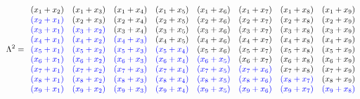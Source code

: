 \documentclass[11]{article}
\begin{document}
\[
\Lambda^2 =
\begin{array}{llllllll}
(x_1+x_2) & (x_1+x_3) & (x_1+x_4) & (x_1+x_5) & (x_1+x_6) & (x_1+x_7) & (x_1+x_8) & (x_1+x_9) \\
\textcolor{blue}{(x_2+x_1)} & (x_2+x_3) & (x_2+x_4) & (x_2+x_5) & (x_2+x_6) & (x_2+x_7) & (x_2+x_8) & (x_2+x_9) \\
\textcolor{blue}{(x_3+x_1)} & \textcolor{blue}{(x_3+x_2)} & (x_3+x_4) & (x_3+x_5) & (x_3+x_6) & (x_3+x_7) & (x_3+x_8) & (x_3+x_9) \\
\textcolor{blue}{(x_4+x_1)} & \textcolor{blue}{(x_4+x_2)} & \textcolor{blue}{(x_4+x_3)} & (x_4+x_5) & (x_4+x_6) & (x_4+x_7) & (x_4+x_8) & (x_4+x_9) \\
\textcolor{blue}{(x_5+x_1)} & \textcolor{blue}{(x_5+x_2)} & \textcolor{blue}{(x_5+x_3)} & \textcolor{blue}{(x_5+x_4)} & (x_5+x_6) & (x_5+x_7) & (x_5+x_8) & (x_5+x_9) \\
\textcolor{blue}{(x_6+x_1)} & \textcolor{blue}{(x_6+x_2)} & \textcolor{blue}{(x_6+x_3)} & \textcolor{blue}{(x_6+x_4)} & \textcolor{blue}{(x_6+x_5)} & (x_6+x_7) & (x_6+x_8) & (x_6+x_9) \\
\textcolor{blue}{(x_7+x_1)} & \textcolor{blue}{(x_7+x_2)} & \textcolor{blue}{(x_7+x_3)} & \textcolor{blue}{(x_7+x_4)} & \textcolor{blue}{(x_7+x_5)} & \textcolor{blue}{(x_7+x_6)} & (x_7+x_8) & (x_7+x_9) \\
\textcolor{blue}{(x_8+x_1)} & \textcolor{blue}{(x_8+x_2)} & \textcolor{blue}{(x_8+x_3)} & \textcolor{blue}{(x_8+x_4)} & \textcolor{blue}{(x_8+x_5)} & \textcolor{blue}{(x_8+x_6)} & \textcolor{blue}{(x_8+x_7)} & (x_8+x_9) \\
\textcolor{blue}{(x_9+x_1)} & \textcolor{blue}{(x_9+x_2)} & \textcolor{blue}{(x_9+x_3)} & \textcolor{blue}{(x_9+x_4)} & \textcolor{blue}{(x_9+x_5)} & \textcolor{blue}{(x_9+x_6)} & \textcolor{blue}{(x_9+x_7)} & \textcolor{blue}{(x_9+x_8)}
\end{array}
\]
\end{document}
